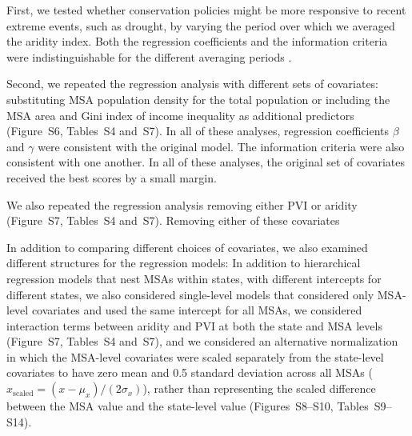 \documentclass[draft,linenumbers]{agujournal}\usepackage{knitr}
\begin{document}
First, we tested whether conservation policies might be more
responsive to recent extreme events, such as drought, by varying the
period over which we averaged the aridity index.
Both the regression coefficients and the information criteria were
indistinguishable for the different averaging periods
.

Second, we repeated the regression analysis
with different sets of covariates:
substituting MSA population density
for the total population or
including the MSA area and Gini index of income inequality as additional
predictors (Figure~S6, Tables~S4 and~S7).
In all of these analyses, regression coefficients $\beta$ and $\gamma$
were consistent with the original model.
The information criteria were also consistent with one another.
In all of these analyses, the original set of covariates received the best
scores by a small%
margin.

We also repeated the regression analysis removing either PVI or aridity
(Figure~S7, Tables~S4 and~S7).
Removing either of these covariates
%

In addition to comparing different choices of covariates, we also
examined different structures for the regression models:
In addition to hierarchical regression models that nest MSAs within states,
with different intercepts for different states, we also
considered single-level models that considered only MSA-level covariates and
used the same intercept for all MSAs,
we considered interaction terms between aridity and PVI at both
the state and MSA levels (Figure~S7, Tables~S4 and~S7),
and we considered an alternative normalization
in which the MSA-level covariates were scaled separately
from the state-level covariates to have zero mean and 0.5 standard deviation
across all MSAs ($x_{\text{scaled}} = (x - \mu_x) / (2 \sigma_x)$),
rather than representing
the scaled difference between the MSA value and the state-level value
(Figures~S8--S10, Tables~S9--S14).
\end{document}
